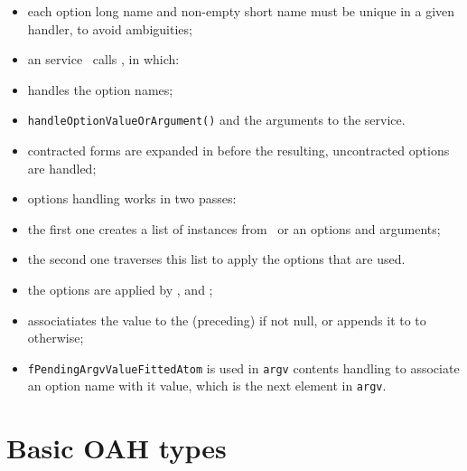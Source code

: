 \begin{itemize}
\item each option long name and non-empty short name must be unique in a given handler,
    to avoid ambiguities;

\item an service \mainFunction\ calls , in which:
  \item {} handles the option names;
  \item {\tt handleOptionValueOrArgument()}%
      and the arguments to the service.

\item contracted forms are expanded in  before the resulting,
    uncontracted options are handled;

\item options handling works in two passes:
    \item the first one creates a list of  instances from
        \argcargv\ or an options and arguments;
    \item the second one traverses this list to apply the options that are used.

\item the options are applied by ,  and
    ;

\item {} associatiates the value
    to the (preceding)  if not null,
    or appends it to  to otherwise;

\item {\tt fPendingArgvValueFittedAtom} is used in {\tt argv} contents handling
    to associate an option name with it value, which is the next element in {\tt argv}.

\end{itemize}


\section{Basic OAH types}


